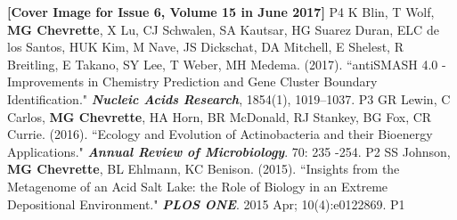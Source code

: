 \begin{cvpubs}
{	\linebreak \textbf{[Cover Image for Issue 6, Volume 15 in June 2017]}    
    } %
    {P4} %
  \cvpub
    {K Blin, T Wolf, \textbf{MG Chevrette}, X Lu, CJ Schwalen, SA Kautsar, HG Suarez Duran, ELC de los Santos, HUK Kim, M Nave, JS Dickschat, DA Mitchell, E Shelest, R Breitling, E Takano, SY Lee, T Weber, MH Medema. (2017). ``antiSMASH 4.0 - Improvements in Chemistry Prediction and Gene Cluster Boundary Identification." \textit{\textbf{Nucleic Acids Research}}, 1854(1), 1019–1037. \textbf{\textit{}} }  %
    {P3} %
  \cvpub
    {GR Lewin, C Carlos, \textbf{MG Chevrette}, HA Horn, BR McDonald, RJ Stankey, BG Fox, CR Currie. (2016). ``Ecology and Evolution of Actinobacteria and their Bioenergy Applications." \textit{\textbf{Annual Review of Microbiology}}. 70: 235 -254. \textbf{\textit{}} } %
    {P2} %
  \cvpub
    {SS Johnson, \textbf{MG Chevrette}, BL Ehlmann, KC Benison. (2015). ``Insights from the Metagenome of an Acid Salt Lake: the Role of Biology in an Extreme Depositional Environment."  \textit{\textbf{PLOS ONE}}. 2015 Apr; 10(4):e0122869. \textbf{\textit{}} } %
    {P1} %
\end{cvpubs}


